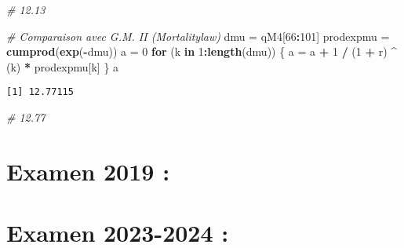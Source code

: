 \documentclass[
]{article}
\newenvironment{Shaded}{\begin{snugshade}}{\end{snugshade}}
\newcommand{\CommentTok}[1]{\textcolor[rgb]{0.56,0.35,0.01}{\textit{#1}}}
\newcommand{\ControlFlowTok}[1]{\textcolor[rgb]{0.13,0.29,0.53}{\textbf{#1}}}
\newcommand{\DecValTok}[1]{\textcolor[rgb]{0.00,0.00,0.81}{#1}}
\newcommand{\FunctionTok}[1]{\textcolor[rgb]{0.13,0.29,0.53}{\textbf{#1}}}
\newcommand{\NormalTok}[1]{#1}
\newcommand{\OtherTok}[1]{\textcolor[rgb]{0.56,0.35,0.01}{#1}}
\newcommand{\SpecialCharTok}[1]{\textcolor[rgb]{0.81,0.36,0.00}{\textbf{#1}}}
\begin{document}
\begin{Shaded}
\begin{Highlighting}[]
\CommentTok{\# 12.13}

\CommentTok{\# Comparaison avec G.M. II  (Mortalitylaw)}
\NormalTok{dmu }\OtherTok{=}\NormalTok{ qM4[}\DecValTok{66}\SpecialCharTok{:}\DecValTok{101}\NormalTok{]}
\NormalTok{prodexpmu }\OtherTok{=} \FunctionTok{cumprod}\NormalTok{(}\FunctionTok{exp}\NormalTok{(}\SpecialCharTok{{-}}\NormalTok{dmu))}
\NormalTok{a }\OtherTok{=} \DecValTok{0}
\ControlFlowTok{for}\NormalTok{ (k }\ControlFlowTok{in} \DecValTok{1}\SpecialCharTok{:}\FunctionTok{length}\NormalTok{(dmu))}
\NormalTok{\{}
\NormalTok{  a }\OtherTok{=}\NormalTok{ a }\SpecialCharTok{+} \DecValTok{1} \SpecialCharTok{/}\NormalTok{ (}\DecValTok{1} \SpecialCharTok{+}\NormalTok{ r) }\SpecialCharTok{\^{}}\NormalTok{ (k) }\SpecialCharTok{*}\NormalTok{ prodexpmu[k]}
\NormalTok{\}}
\NormalTok{a}
\end{Highlighting}
\end{Shaded}

\begin{verbatim}
[1] 12.77115
\end{verbatim}

\begin{Shaded}
\begin{Highlighting}[]
\CommentTok{\# 12.77}
\end{Highlighting}
\end{Shaded}

\hypertarget{examen-2019}{%
\section{Examen 2019 :}\label{examen-2019}}

\hypertarget{examen-2023-2024}{%
\section{Examen 2023-2024 :}\label{examen-2023-2024}}
\end{document}
